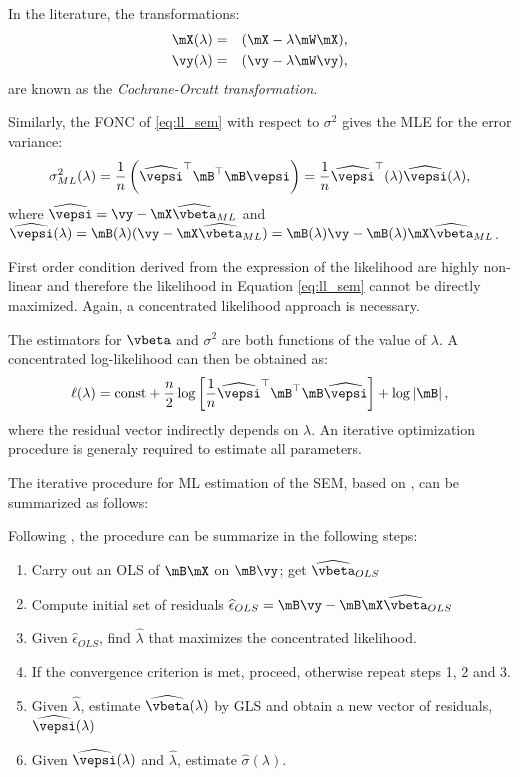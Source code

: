 \documentclass[english,12pt]{book}\usepackage[]{graphicx}\usepackage[]{xcolor}
\begin{document}
\begin{remark}
In the literature, the transformations:
\begin{eqnarray*}
\mX(\lambda) &=&(\mX - \lambda\mW\mX), \\
\vy(\lambda) &=& (\vy - \lambda \mW \vy),
\end{eqnarray*}
%
are known as the \emph{Cochrane-Orcutt transformation}.
\end{remark}

Similarly, the FONC of \eqref{eq:ll_sem} with respect to $\sigma^2$ gives the MLE for the error variance:
\begin{equation}
	\sigma^2_{ML}(\lambda) = \frac{1}{n}\left(\widehat{\vepsi}^\top\mB^\top\mB \vepsi\right)= \frac{1}{n}\widehat{\vepsi}^\top(\lambda)\widehat{\vepsi}(\lambda),
\end{equation}
%
where $\widehat{\vepsi} = \vy - \mX\widehat{\vbeta}_{ML}$ and $\widehat{\vepsi}(\lambda) = \mB(\lambda)(\vy - \mX\widehat{\vbeta}_{ML}) = \mB(\lambda)\vy - \mB(\lambda)\mX\widehat{\vbeta}_{ML}$. 

First order condition derived from the expression of the likelihood are highly non-linear and therefore the likelihood in Equation \eqref{eq:ll_sem} cannot be directly maximized. Again, a concentrated likelihood approach is necessary.

The estimators for $\vbeta$ and $\sigma^2$ are both functions of the value of $\lambda$. A concentrated log-likelihood can then be obtained as:
\begin{equation}
	\ell(\lambda)= \mbox{const} + \frac{n}{2}\log\left[\frac{1}{n}\widehat{\vepsi}^\top\mB^\top\mB \widehat{\vepsi}\right] + \log\left|\mB\right|, 
\end{equation}
%
where the residual vector indirectly depends on $\lambda$. An iterative optimization procedure is generaly required to estimate all parameters. 

The iterative procedure for ML estimation of the SEM, based on \cite{anselin1988spatial}, can be summarized as follows:
\begin{algorithm}
Following \cite{anselin1988spatial}, the procedure can be summarize in the following steps:
\begin{enumerate}
		\item Carry out an OLS of $\mB\mX$ on $\mB\vy$; get $\widehat{\vbeta}_{OLS}$
		\item Compute initial set of residuals $\widehat{\epsilon}_{OLS} = \mB\vy - \mB\mX\widehat{\vbeta}_{OLS}$
		\item Given $\widehat{\epsilon}_{OLS} $, find $\widehat{\lambda}$ that maximizes the concentrated likelihood.
		\item If the convergence criterion is met, proceed, otherwise repeat steps 1, 2 and 3.
		\item Given $\widehat{\lambda}$, estimate $\widehat{\vbeta}(\lambda)$ by GLS and obtain a new vector of residuals, $\widehat{\vepsi}(\lambda)$
		\item Given  $\widehat{\vepsi}(\lambda)$ and $\widehat{\lambda}$, estimate $\widehat{\sigma}(\lambda)$.
\end{enumerate}	
\end{algorithm}
\end{document}
